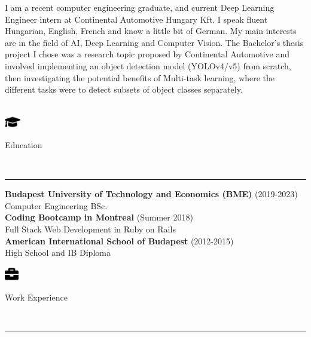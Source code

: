 \documentclass{article}
\begin{document}
I am a recent computer engineering graduate, and current Deep Learning Engineer intern at Continental Automotive Hungary Kft. I speak fluent Hungarian, English, French and know a little bit of German. My main interests are in the field of AI, Deep Learning and Computer Vision. The Bachelor's thesis project I chose was a research topic proposed by Continental Automotive and involved implementing an object detection model (YOLOv4/v5) from scratch, then investigating the potential benefits of Multi-task learning, where the different tasks were to detect subsets of object classes separately. \\
\\
\begin{minipage}[c]{7mm}
    \includegraphics[width=7mm]{../images/graduation-cap-solid.pdf}
\end{minipage}
\begin{minipage}[c]{100mm}
    {\large{Education}}
\end{minipage} \\
\hrule
\bigskip

\noindent
\textbf{Budapest University of Technology and Economics (BME)} \hspace{3mm} \color{gray} (2019-2023) \color{black} \\
Computer Engineering BSc.
\smallskip \\

\noindent
\textbf{Coding Bootcamp in Montreal} \hspace{3mm} \color{gray} (Summer 2018) \color{black} \\
Full Stack Web Development in Ruby on Rails
\smallskip \\

\noindent
\textbf{American International School of Budapest} \hspace{3mm} \color{gray} (2012-2015) \color{black} \\
High School and IB Diploma
\smallskip \\

\noindent
\begin{minipage}[c]{7mm}
    \includegraphics[width=6mm]{../images/briefcase-solid.pdf}
\end{minipage}
\begin{minipage}[c]{100mm}
    {\large{Work Experience}}
\end{minipage} \\
\hrule
\bigskip
\end{document}
